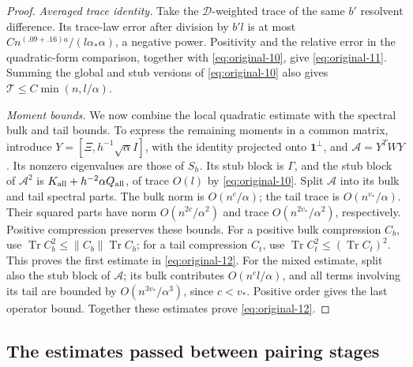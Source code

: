 \begin{proof}
\emph{Averaged trace identity.}
Take the $\mathcal D$-weighted trace of the same $b'$ resolvent
difference. Its trace-law error after division by $b'l$ is at most
$Cn^{(.09+.16)a}/(l\alpha_*\alpha)$, a negative power. Positivity
and the relative error in the quadratic-form comparison, together
with \eqref{eq:original-10}, give \eqref{eq:original-11}.
Summing the global and stub versions of \eqref{eq:original-10}
also gives $\mathcal T\le C\min(n,l/\alpha)$.

\emph{Moment bounds.}
We now combine the local quadratic estimate with the spectral bulk
and tail bounds. To express the remaining moments in a common matrix,
introduce
$Y=[\Xi,h^{-1}\sqrt\alpha I]$, with the identity projected onto
$\mathbf1^\perp$, and $\mathcal A=Y^TWY$. Its nonzero eigenvalues
are those of $S_h$. Its stub block is $\Gamma$, and the stub block
of $\mathcal A^2$ is $K_{\rm all}+h^{-2}\alpha Q_{\rm all}$,
of trace $O(l)$ by \eqref{eq:original-10}. Split $\mathcal A$ into
its bulk and tail spectral parts. The bulk norm is $O(n^c/\alpha)$;
the tail trace is $O(n^{v_*}/\alpha)$. Their squared parts have
norm $O(n^{2c}/\alpha^2)$ and trace $O(n^{2v_*}/\alpha^2)$,
respectively. Positive compression preserves these bounds.
For a positive bulk compression $C_b$, use
$\operatorname{Tr}C_b^2\le\|C_b\|\operatorname{Tr}C_b$;
for a tail compression $C_t$, use
$\operatorname{Tr}C_t^2\le(\operatorname{Tr}C_t)^2$.
This proves the first estimate in \eqref{eq:original-12}. For the mixed
estimate, split
also the stub block of $\mathcal A$; its bulk contributes
$O(n^cl/\alpha)$, and all terms involving its tail are bounded by
$O(n^{3v_*}/\alpha^3)$, since $c<v_*$. Positive order gives the
last operator bound. Together these estimates prove
\eqref{eq:original-12}.
\end{proof}

\subsection{The estimates passed between pairing stages}

